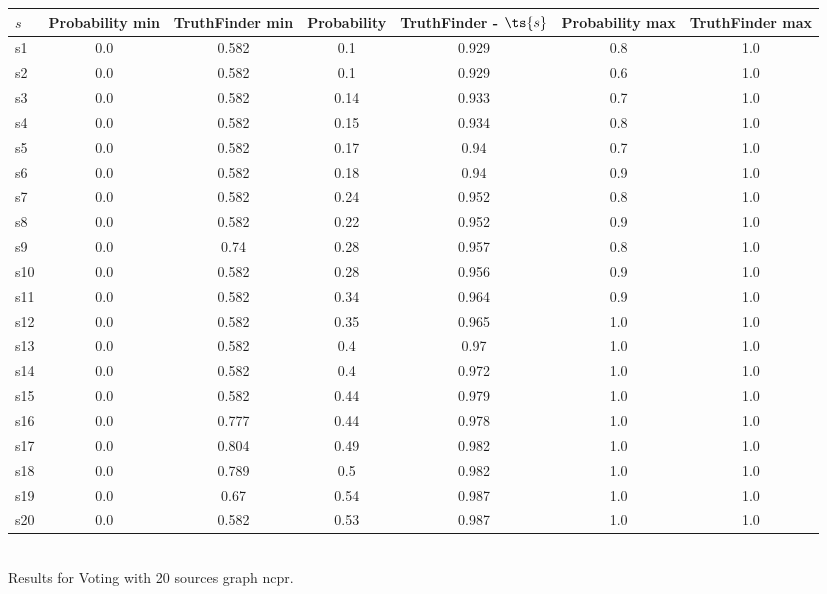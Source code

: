 \documentclass{article}
\begin{document}
\noindent\begin{tabular}{|l|c|c|c|c|c|c|}
\hline
$s$& Probability min & TruthFinder min & Probability & TruthFinder - $\ts{s}$ & Probability max & TruthFinder max\\
\hline
s1 &0.0 & 0.582 & 0.1 & 0.929 & 0.8 & 1.0\\
\hline
s2 &0.0 & 0.582 & 0.1 & 0.929 & 0.6 & 1.0\\
\hline
s3 &0.0 & 0.582 & 0.14 & 0.933 & 0.7 & 1.0\\
\hline
s4 &0.0 & 0.582 & 0.15 & 0.934 & 0.8 & 1.0\\
\hline
s5 &0.0 & 0.582 & 0.17 & 0.94 & 0.7 & 1.0\\
\hline
s6 &0.0 & 0.582 & 0.18 & 0.94 & 0.9 & 1.0\\
\hline
s7 &0.0 & 0.582 & 0.24 & 0.952 & 0.8 & 1.0\\
\hline
s8 &0.0 & 0.582 & 0.22 & 0.952 & 0.9 & 1.0\\
\hline
s9 &0.0 & 0.74 & 0.28 & 0.957 & 0.8 & 1.0\\
\hline
s10 &0.0 & 0.582 & 0.28 & 0.956 & 0.9 & 1.0\\
\hline
s11 &0.0 & 0.582 & 0.34 & 0.964 & 0.9 & 1.0\\
\hline
s12 &0.0 & 0.582 & 0.35 & 0.965 & 1.0 & 1.0\\
\hline
s13 &0.0 & 0.582 & 0.4 & 0.97 & 1.0 & 1.0\\
\hline
s14 &0.0 & 0.582 & 0.4 & 0.972 & 1.0 & 1.0\\
\hline
s15 &0.0 & 0.582 & 0.44 & 0.979 & 1.0 & 1.0\\
\hline
s16 &0.0 & 0.777 & 0.44 & 0.978 & 1.0 & 1.0\\
\hline
s17 &0.0 & 0.804 & 0.49 & 0.982 & 1.0 & 1.0\\
\hline
s18 &0.0 & 0.789 & 0.5 & 0.982 & 1.0 & 1.0\\
\hline
s19 &0.0 & 0.67 & 0.54 & 0.987 & 1.0 & 1.0\\
\hline
s20 &0.0 & 0.582 & 0.53 & 0.987 & 1.0 & 1.0\\
\hline
\end{tabular}\\

\noindent Results for Voting with 20 sources graph ncpr.
\end{document}
